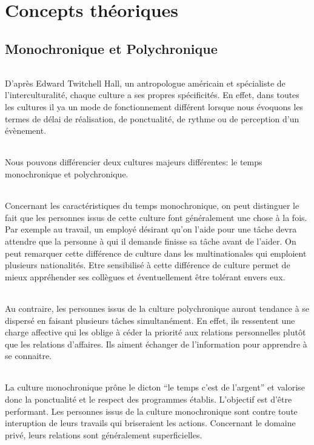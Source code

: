 \part{Concepts théoriques}
\chapter{Monochronique et Polychronique}
\paragraph{}
D'après Edward Twitchell Hall, un antropologue américain et spécialiste de l'interculturalité, chaque culture a ses propres spécificités. En effet, dans toutes les cultures il ya un mode de fonctionnement différent lorsque nous évoquons les termes de délai de réalisation, de ponctualité, de rythme ou de perception d'un évènement.
\paragraph{}
Nous pouvons différencier deux cultures majeurs différentes: le temps monochronique et polychronique.
\paragraph{}
Concernant les caractéristiques du temps monochronique, on peut distinguer le fait que les personnes issus de cette culture font généralement une chose à la fois. Par exemple au travail, un employé désirant qu'on l'aide pour une tâche devra attendre que la personne à qui il demande finisse sa tâche avant de l'aider. On peut remarquer cette différence de culture dans les multinationales qui emploient plusieurs nationalités. Etre sensibilisé à cette différence de culture permet de mieux appréhender ses collègues et éventuellement être tolérant envers eux.
\paragraph{}
Au contraire, les personnes issus de la culture polychronique auront tendance à se dispersé en faisant plusieurs tâches simultanément. En effet, ils ressentent une charge affective qui les oblige à céder la priorité aux relations personnelles plutôt que les relations d'affaires. Ils aiment échanger de l'information pour apprendre à se connaitre.
\paragraph{}
La culture monochronique prône le dicton "`le temps c'est de l'argent"' et valorise donc la ponctualité et le respect des programmes établis. L'objectif est d'être performant. Les personnes issus de la culture monochronique sont contre toute interuption de leurs travails qui briseraient les actions. Concernant le domaine privé, leurs relations sont généralement superficielles.

